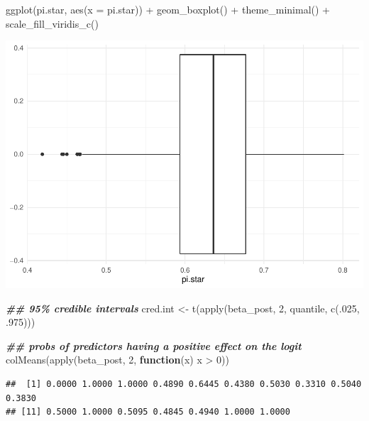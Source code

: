 \documentclass[
]{article}
\newenvironment{Shaded}{\begin{snugshade}}{\end{snugshade}}
\newcommand{\AttributeTok}[1]{\textcolor[rgb]{0.77,0.63,0.00}{#1}}
\newcommand{\ControlFlowTok}[1]{\textcolor[rgb]{0.13,0.29,0.53}{\textbf{#1}}}
\newcommand{\DecValTok}[1]{\textcolor[rgb]{0.00,0.00,0.81}{#1}}
\newcommand{\DocumentationTok}[1]{\textcolor[rgb]{0.56,0.35,0.01}{\textbf{\textit{#1}}}}
\newcommand{\FunctionTok}[1]{\textcolor[rgb]{0.00,0.00,0.00}{#1}}
\newcommand{\NormalTok}[1]{#1}
\newcommand{\OtherTok}[1]{\textcolor[rgb]{0.56,0.35,0.01}{#1}}
\newcommand{\SpecialCharTok}[1]{\textcolor[rgb]{0.00,0.00,0.00}{#1}}
\begin{document}
\begin{Shaded}
\begin{Highlighting}[]
\FunctionTok{ggplot}\NormalTok{(pi.star, }\FunctionTok{aes}\NormalTok{(}\AttributeTok{x =}\NormalTok{ pi.star)) }\SpecialCharTok{+} \FunctionTok{geom\_boxplot}\NormalTok{() }\SpecialCharTok{+} \FunctionTok{theme\_minimal}\NormalTok{() }\SpecialCharTok{+} \FunctionTok{scale\_fill\_viridis\_c}\NormalTok{()}
\end{Highlighting}
\end{Shaded}

\includegraphics{bmp_main_files/figure-latex/unnamed-chunk-8-2.pdf}

\begin{Shaded}
\begin{Highlighting}[]
\DocumentationTok{\#\# 95\%  credible intervals}
\NormalTok{cred.int }\OtherTok{\textless{}{-}} \FunctionTok{t}\NormalTok{(}\FunctionTok{apply}\NormalTok{(beta\_post, }\DecValTok{2}\NormalTok{, quantile, }\FunctionTok{c}\NormalTok{(.}\DecValTok{025}\NormalTok{, .}\DecValTok{975}\NormalTok{)))}

\DocumentationTok{\#\# probs of predictors having a positive effect on the logit}
\FunctionTok{colMeans}\NormalTok{(}\FunctionTok{apply}\NormalTok{(beta\_post, }\DecValTok{2}\NormalTok{, }\ControlFlowTok{function}\NormalTok{(x) x }\SpecialCharTok{\textgreater{}} \DecValTok{0}\NormalTok{))}
\end{Highlighting}
\end{Shaded}

\begin{verbatim}
##  [1] 0.0000 1.0000 1.0000 0.4890 0.6445 0.4380 0.5030 0.3310 0.5040 0.3830
## [11] 0.5000 1.0000 0.5095 0.4845 0.4940 1.0000 1.0000
\end{verbatim}
\end{document}
